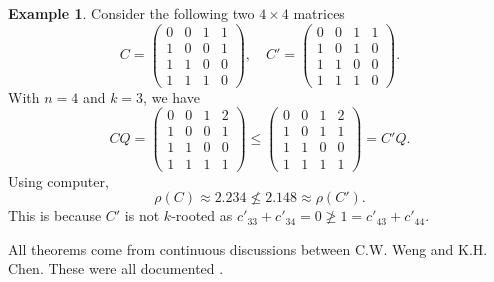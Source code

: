 \documentclass[12pt, a4paper]{article}
\theoremstyle{plain}
\theoremstyle{definition}
\newtheorem{exam}[thm]{Example}
\begin{document}
\begin{exam}
    Consider the following two $4\times 4$ matrices
    $$C=\begin{pmatrix}
    0 & 0 & 1 & 1\\
    1 & 0 & 0 & 1\\
    1 & 1 & 0 & 0\\
    1 & 1 & 1 & 0
    \end{pmatrix},\quad C'=\begin{pmatrix}
    0 & 0 & 1 & 1\\
    1 & 0 & 1 &  0\\
    1 & 1 & 0 & 0\\
    1 & 1 & 1 & 0
    \end{pmatrix}.$$
    With $n=4$ and $k=3$, we have  
    $$CQ=\begin{pmatrix}
    0 & 0 & 1 & 2\\
    1 & 0 & 0 & 1\\
    1 & 1 & 0 & 0\\
    1 & 1 & 1 & 1
    \end{pmatrix}\leq \begin{pmatrix}
    0 & 0 & 1 & 2\\
    1 & 0 & 1 & 1\\
    1 & 1 & 0 & 0\\
    1 & 1 & 1 & 1
    \end{pmatrix}=C'Q.$$
Using computer, \cite[sage]{sage}
    $$\rho(C)\approx 2.234\not\leq 2.148\approx \rho(C').$$
    This is because $C'$ is not $k$-rooted as $c'_{33}+c'_{34}=0\not\geq 1=c'_{43}+c'_{44}$.

All theorems come from continuous discussions between C.W. Weng and K.H. Chen. These were all documented \cite{src_files}.
    
\end{exam}

\end{document}
